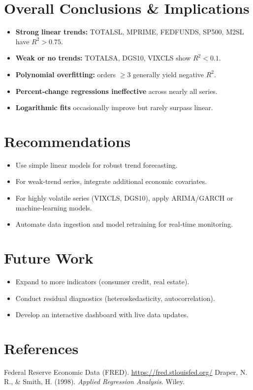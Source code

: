 \documentclass[11pt,a4paper]{article}
\begin{document}
\clearpage
\section{Overall Conclusions \& Implications}
\begin{itemize}
  \item \textbf{Strong linear trends:} TOTALSL, MPRIME, FEDFUNDS, SP500, M2SL have \(R^2>0.75\).
  \item \textbf{Weak or no trends:} TOTALSA, DGS10, VIXCLS show \(R^2<0.1\).
  \item \textbf{Polynomial overfitting:} orders \(\ge3\) generally yield negative \(R^2\).
  \item \textbf{Percent‐change regressions ineffective} across nearly all series.
  \item \textbf{Logarithmic fits} occasionally improve but rarely surpass linear.
\end{itemize}

\section{Recommendations}
\begin{itemize}
  \item Use simple linear models for robust trend forecasting.
  \item For weak‐trend series, integrate additional economic covariates.
  \item For highly volatile series (VIXCLS, DGS10), apply ARIMA/GARCH or machine‐learning models.
  \item Automate data ingestion and model retraining for real‐time monitoring.
\end{itemize}

\section{Future Work}
\begin{itemize}
  \item Expand to more indicators (consumer credit, real estate).
  \item Conduct residual diagnostics (heteroskedasticity, autocorrelation).
  \item Develop an interactive dashboard with live data updates.
\end{itemize}

\clearpage
\section*{References}
\begin{thebibliography}{9}
 Federal Reserve Economic Data (FRED). \url{https://fred.stlouisfed.org/}
 Draper, N. R., \& Smith, H. (1998). \emph{Applied Regression Analysis}. Wiley.
\end{thebibliography}
\end{document}
